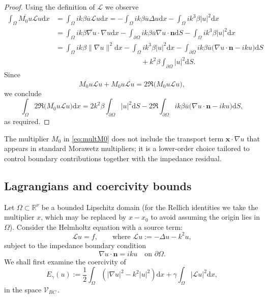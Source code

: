 \documentclass[twoside,11pt]{article}
\def\dimx{\nu }
\def\d{{\mathrm d}}
\def\L{{\mathscr{L}}}
\newcommand{\qp}[1]{\ensuremath{\!\left({#1}\right)}}
\newcommand{\norm}[1]{\ensuremath{\left|#1\right|}}
\renewcommand{\vec}[1]{\boldsymbol{#1}}
\def\Vcbc{{\mathscr V}_{BC}}
\def\L{{\mathscr{L}}}
\begin{document}
{\begin{proof}
Using the definition of $\L$ we observe
\begin{align*} 
    \int_\Omega \overline{M_0 u}  \L  u    \d x
    &=    \int_\Omega i k \beta   \overline{u}  \L  u    \d x
      =  -   \int_\Omega i k \beta   \overline{u}  \Delta u    \d x  -   \int_\Omega i k^3 \beta   |u|^2    \d x
      \\
    &=  \int_\Omega i k \beta   \overline{\nabla  u} \cdot \nabla u    \d x  -   \int_{\partial \Omega} i k \beta   \overline{u}  \nabla u \cdot \vec{n}   \d S
        -   \int_\Omega i k^3 \beta   |u|^2    \d x
        \\
   &=  \int_\Omega i k \beta   \|\nabla u\|^2   \d x 
        -   \int_\Omega i k^3 \beta   |u|^2    \d x  -   \int_{\partial \Omega} i k \beta   \overline{u}   \Big ( \nabla u \cdot \vec{n}
          -ik   u \Big )    \d S\\
   &\qquad\qquad\qquad\qquad\qquad\qquad +  k ^2 \beta  \int_{\partial \Omega} |u|^2    \d S  .
\end{align*}
Since 
\[
\overline{M_0 u}  \L  u + M_0 u  \overline{\L  u}= 2  \Re  \big( \overline{M_0 u}  \L  u\big),
\]
we conclude
\begin{equation*}
    \int_\Omega  2  \Re  \big( \overline{M_0 u}  \L  u\big)    \d x
     =     2 k ^2 \beta  \int_{\partial \Omega} |u|^2    \d S
         -  2  \Re   \int_{\partial \Omega} i k \beta   \overline{u}  \Big ( \nabla u \cdot \vec{n}
          -ik   u \Big )    \d S ,
\end{equation*}
as required.
\end{proof}

\begin{remark}
{The multiplier $M_0$ in \eqref{eq:multM0} does not include the transport term $\vec{x} \cdot \nabla u$ that appears in standard Morawetz multipliers; it is a lower-order choice tailored to control boundary contributions together with the impedance residual.}
\end{remark}


\subsection*{Lagrangians and coercivity bounds}
{Let $\Omega \subset \mathbb{R}^\dimx$ be a bounded Lipschitz domain (for the Rellich identities we take the multiplier $x$, which may be replaced by $x-x_0$ to avoid assuming the origin lies in $\Omega$).} Consider the Helmholtz equation with a source term:
\[
  \L u = f, \qquad \text{where } \L u := -\Delta u - k^2 u,
\]
subject to the impedance boundary condition
\begin{equation}\label{bc_section4}
  \nabla u \cdot \vec{n} = i k  u \quad \text{on } \partial \Omega.
\end{equation}
 {We shall first examine the coercivity of  }
\begin{equation}\label{Egamma}
  E_\gamma(u)
  :=
  \frac{1}{2} \int_\Omega \qp{\norm{\nabla u}^2 - k^2 \norm{u}^2}    \d x
   + 
  \gamma \int_\Omega \norm{\L u}^2    \d x,
\end{equation}
in the space $\Vcbc \, .$

}
\end{document}
